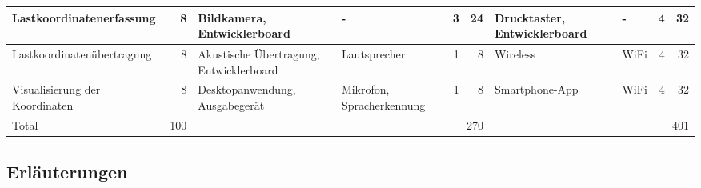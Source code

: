 \documentclass[a4paper,11pt]{scrartcl}
\begin{document}
\begin{landscape}
\begin{tabularx}{\linewidth}{|X|r|X|X|r|r|X|X|r|r|}
\hline
Last\-koordinaten\-erfassung & 8 & Bildkamera, Entwicklerboard & - & 3 & 24 & Drucktaster, Entwicklerboard & - & 4 & 32 \\
\hline
Last\-koordinaten\-über\-tragung & 8 & Akustische Übertragung, Entwicklerboard & Lautsprecher & 1 & 8 & Wireless & WiFi & 4 & 32 \\
\hline
Visualisierung der Koordinaten & 8 & Desktop\-anwendung, Ausgabegerät & Mikrofon, Spracherkennung & 1 & 8 & Smartphone-App & WiFi & 4 & 32 \\
\hline
Total & 100 & \multicolumn{4}{r|}{\textsc{270}} & \multicolumn{4}{r|}{\textsc{401}} \\
\hline
\end{tabularx}
\end{landscape}

\pagestyle{plain}

\subsection{Erläuterungen}
\end{document}
